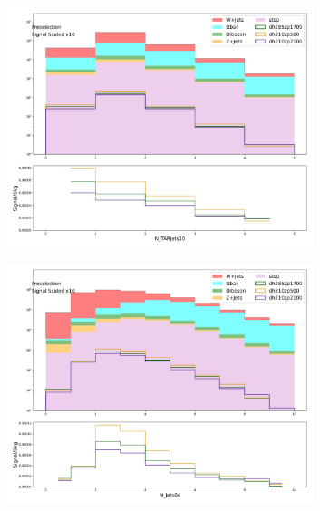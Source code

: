     \begin{figure}[htbp]
      \centering

         \begin{subfigure}{0.49\textwidth}
         \includegraphics[width = 0.98\textwidth]{Figures/appendix/Preselection/N_TARJets10.png}
         \caption{\NTAR}
         \end{subfigure}
         \begin{subfigure}{0.49\textwidth}
         \includegraphics[width = 0.98\textwidth]{Figures/appendix/Preselection/N_Jets04.png}
         \caption{\Njets}
         \end{subfigure}
         \begin{subfigure}{0.49\textwidth}

\end{subfigure}
\end{figure}
